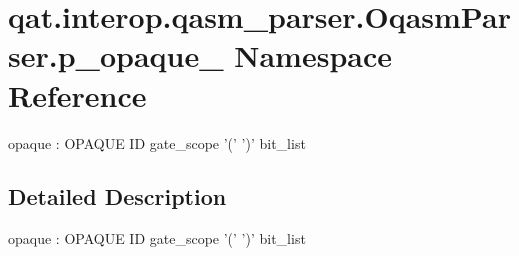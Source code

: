 \hypertarget{namespaceqat_1_1interop_1_1qasm__parser_1_1OqasmParser_1_1p__opaque__1}{\section{qat.\-interop.\-qasm\-\_\-parser.\-Oqasm\-Parser.\-p\-\_\-opaque\-\_ Namespace Reference}
\label{namespaceqat_1_1interop_1_1qasm__parser_1_1OqasmParser_1_1p__opaque__1}
}


opaque \-: O\-P\-A\-Q\-U\-E I\-D gate\-\_\-scope '(' ')' bit\-\_\-list  




\subsection{Detailed Description}
opaque \-: O\-P\-A\-Q\-U\-E I\-D gate\-\_\-scope '(' ')' bit\-\_\-list 